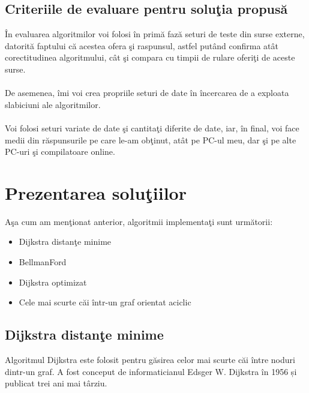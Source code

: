 \documentclass[runningheads]{llncs}
\begin{document}
\subsection{Criteriile de evaluare pentru solu\c{t}ia propus\u{a}}
\hspace{6pt}\^{I}n evaluarea algoritmilor voi folosi \^{i}n prim\u{a} faz\u{a} seturi de teste din surse externe, datorit\u{a} faptului c\u{a} acestea ofera \c{s}i raspunsul, astfel put\^{a}nd confirma at\^{a}t corectitudinea algoritmului, c\^{a}t \c{s}i compara cu timpii de rulare oferi\c{t}i de aceste surse.
\paragraph{}De asemenea, \^{i}mi voi crea propriile seturi de date \^{i}n \^{i}ncercarea de a exploata slabiciuni ale algoritmilor.
\paragraph{}Voi folosi seturi variate de date \c{s}i cantita\c{t}i diferite de date, iar, \^{i}n final, voi face medii din r\u{a}spunsurile pe care le-am ob\c{t}inut, at\^{a}t pe PC-ul meu, dar \c{s}i pe alte PC-uri \c{s}i compilatoare online.

\newpage
\section{Prezentarea solu\c{t}iilor}

A\c{s}a cum am men\c{t}ionat anterior, algoritmii implementa\c{t}i sunt urm\u{a}torii:

\begin{itemize}
	\item Dijkstra distan\c{t}e minime
	\item BellmanFord
	\item Dijkstra optimizat
	\item Cele mai scurte c\u{a}i \^{i}ntr-un graf orientat aciclic
\end{itemize}

\subsection{Dijkstra distan\c{t}e minime}
\hspace{20px} Algoritmul Dijkstra este folosit  pentru găsirea celor mai scurte căi între noduri dintr-un graf. A fost conceput de informaticianul Edsger W. Dijkstra în 1956 și publicat trei ani mai târziu.
\end{document}
